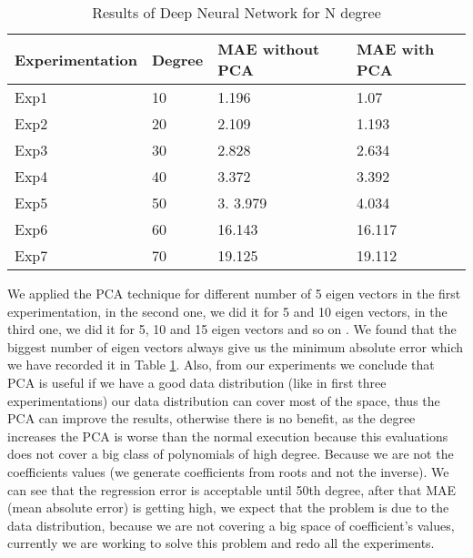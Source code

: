 \documentclass[a4paper,UKenglish]{lipics-v2016}
\begin{document}
 \begin{table}
 \caption{Results of Deep Neural Network for N degree}
 \small
 \begin{center}
 \setlength{\tabcolsep}{0.8em}
 \renewcommand{\arraystretch}{1.5}
 \begin{tabular}{|p{1.9cm}|p{1.5cm}||p{1.5cm}||p{1.5cm}|}
 \hline

 {Experimentation }& {Degree} & {MAE without PCA}  & {MAE with PCA}\\
 \hline
 Exp1& 10 & 1.196 & 1.07 \\
 \hline
 Exp2& 20 & 2.109& 1.193\\
 \hline
 Exp3& 30 & 2.828 & 2.634\\
 \hline
 Exp4& 40& 3.372 &3.392  \\
 \hline
 Exp5& 50& 3. 3.979 & 4.034  \\
 \hline
 Exp6& 60&  16.143 & 16.117 \\
 \hline
 Exp7& 70& 19.125&  19.112  \\
 \hline

 \end{tabular}
 \end{center}
 \label{table:characteristics8}
 \vspace{-5mm}
 \end{table}


 We applied the PCA technique for different number of 5 eigen vectors in the first experimentation, in the second one, we did it for 5 and 10  eigen vectors, in the third one, we did it for 5, 10 and 15 eigen vectors and so on . We found that the biggest number of eigen vectors always give us the minimum absolute  error which we have recorded it in Table \ref{table:characteristics8}. Also, from our experiments we conclude that PCA is useful if we have a good data distribution (like in first three experimentations) our data distribution can cover most of the space, thus the PCA can improve the results, otherwise there is no benefit, as the degree increases the PCA is worse than the normal execution because this evaluations does not cover a big class of polynomials of high degree. Because we are not the coefficients values (we generate coefficients from roots and not the inverse).
 We can see that the regression error is acceptable until 50th degree, after that MAE (mean absolute error) is getting high, we expect that the problem is due to the data distribution, because we are not covering a big space of coefficient’s values, currently we are working to solve this problem and redo all the experiments.
\end{document}
